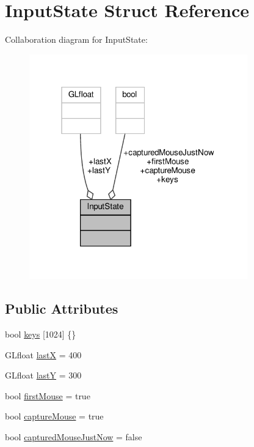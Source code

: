 \hypertarget{structInputState}{}\section{Input\+State Struct Reference}
\label{structInputState}


Collaboration diagram for Input\+State\+:
\nopagebreak
\begin{figure}[H]
\begin{center}
\leavevmode
\includegraphics[width=268pt]{structInputState__coll__graph}
\end{center}
\end{figure}
\subsection*{Public Attributes}
\begin{DoxyCompactItemize}
\item 
bool \hyperlink{structInputState_a6821699434a96ab81583ec2b43f0fc0b}{keys} \mbox{[}1024\mbox{]} \{\}
\item 
G\+Lfloat \hyperlink{structInputState_a5dd10a0ab1fc5f4275a26335d733c79b}{lastX} = 400
\item 
G\+Lfloat \hyperlink{structInputState_a0eda88bc636b0b2a150caa48310a05e3}{lastY} = 300
\item 
bool \hyperlink{structInputState_a289aa049f05b5fad72c9f2c772d99c1e}{first\+Mouse} = true
\item 
bool \hyperlink{structInputState_a0f1bccefb8c7067c973c423692295420}{capture\+Mouse} = true
\item 
bool \hyperlink{structInputState_a2f8fa6ce827fe9a9310cc6c4ebccb1f8}{captured\+Mouse\+Just\+Now} = false
\end{DoxyCompactItemize}


